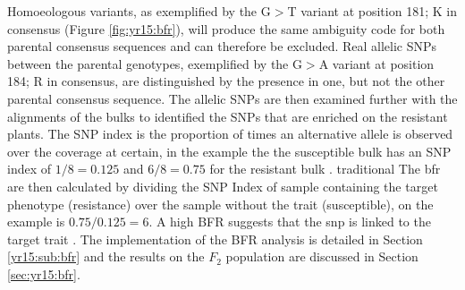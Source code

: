 Homoeologous variants, as exemplified by the G$>$T variant at position 181; K in consensus (Figure \ref{fig:yr15:bfr}), will produce the same ambiguity code for both parental consensus sequences and can therefore be excluded. 
Real allelic SNPs between the parental genotypes, exemplified by the G$>$A variant at position 184; R in consensus, are distinguished by the presence in one, but not the other parental consensus sequence. 
The allelic SNPs are then examined further with the alignments of the bulks to identified the SNPs that are enriched on the resistant plants.
The SNP index is the proportion of times an alternative allele is observed over the coverage at certain, in the example the the susceptible bulk has an SNP index of $1/8=0.125$ and $6/8=0.75$ for the resistant bulk \citep{Takagi2013a}. traditional
The \acrshort{bfr} are then calculated by dividing the SNP Index of sample containing the target phenotype (resistance) over the sample without the trait (susceptible), on the example is $0.75/0.125=6$.  
A high BFR suggests that the \acrshort{snp} is linked to the target trait \citep{Trick2012}. 
The implementation of the BFR analysis is detailed in Section \ref{yr15:sub:bfr} and the results on the $F_2$ population are discussed in Section \ref{sec:yr15:bfr}. 

